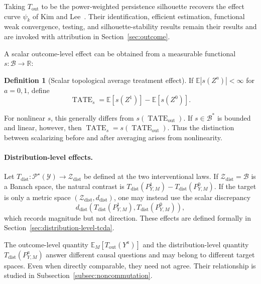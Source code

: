\documentclass[11pt,a4paper]{article}
\theoremstyle{plain}
\theoremstyle{definition}
\newtheorem{definition}[theorem]{Definition}
\theoremstyle{remark}
\newcommand{\1}{\mathbbm{1}}
\begin{document}
Taking \(T_{\mathrm{out}}\) to be the power-weighted persistence silhouette recovers the effect curve \(\psi_k\) of Kim and Lee~\citep{kimlee2026}. Their identification, efficient estimation, functional weak convergence, testing, and silhouette-stability results remain their results and are invoked with attribution in Section~\ref{sec:outcome}.

A scalar outcome-level effect can be obtained from a measurable functional \(s:\mathcal B\to\mathbb R\):

\begin{definition}[Scalar topological average treatment effect]
\label{def:scalar-tate}
If \(\mathbb E|s(Z^a)|<\infty\) for \(a=0,1\), define
\[
\operatorname{TATE}_{s}
=
\mathbb E[s(Z^1)]-\mathbb E[s(Z^0)].
\]
\end{definition}

For nonlinear \(s\), this generally differs from
\(s(\operatorname{TATE}_{\mathrm{out}})\). If
\(s\in\mathcal B^\ast\) is bounded and linear, however, then
\(\operatorname{TATE}_{s} = s(\operatorname{TATE}_{\mathrm{out}})\). Thus the distinction between scalarizing before and after averaging arises from nonlinearity.

\paragraph{Distribution-level effects.}
Let
\(T_{\mathrm{dist}}:\mathcal P^\star(\mathcal Y)\to\mathcal Z_{\mathrm{dist}}\) be defined at the two interventional laws. If \(\mathcal Z_{\mathrm{dist}}=\mathcal B\) is a Banach space, the natural contrast is
\(T_{\mathrm{dist}}(P_{Y,M}^1) - T_{\mathrm{dist}}(P_{Y,M}^0)\). If the target is only a metric space
\((\mathcal Z_{\mathrm{dist}},d_{\mathrm{dist}})\), one may instead use the scalar discrepancy
\[
d_{\mathrm{dist}}\!\left(
T_{\mathrm{dist}}(P_{Y,M}^1),
T_{\mathrm{dist}}(P_{Y,M}^0)
\right),
\]
which records magnitude but not direction. These effects are defined formally in Section~\ref{sec:distribution-level-tcda}.

The outcome-level quantity
\(\mathbb E_M[T_{\mathrm{out}}(Y^a)]\) and the distribution-level quantity \(T_{\mathrm{dist}}(P_{Y,M}^a)\) answer different causal questions and may belong to different target spaces. Even when directly comparable, they need not agree. Their relationship is studied in Subsection~\ref{subsec:noncommutation}.

\end{document}
